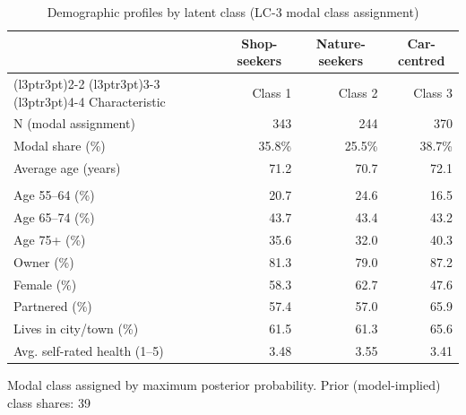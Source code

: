 \begin{table}[!h]
\centering
\caption{\label{tab:lc-profiles}Demographic profiles by latent class (LC-3 modal class assignment)}
\centering
\begin{threeparttable}
\begin{tabular}[t]{lrrr}
\toprule
\multicolumn{1}{c}{ } & \multicolumn{1}{c}{Shop-seekers} & \multicolumn{1}{c}{Nature-seekers} & \multicolumn{1}{c}{Car-centred} \\
\cmidrule(l{3pt}r{3pt}){2-2} \cmidrule(l{3pt}r{3pt}){3-3} \cmidrule(l{3pt}r{3pt}){4-4}
Characteristic & Class 1 & Class 2 & Class 3\\
\midrule
N (modal assignment) & 343 & 244 & 370\\
Modal share (\%) & 35.8\% & 25.5\% & 38.7\%\\
Average age (years) & 71.2 & 70.7 & 72.1\\
\addlinespace[0.3em]
\multicolumn{4}{l}{\textbf{Age group}}\\
\hspace{1em}Age 55--64 (\%) & 20.7 & 24.6 & 16.5\\
\hspace{1em}Age 65--74 (\%) & 43.7 & 43.4 & 43.2\\
\hspace{1em}Age 75+ (\%) & 35.6 & 32.0 & 40.3\\
Owner (\%) & 81.3 & 79.0 & 87.2\\
Female (\%) & 58.3 & 62.7 & 47.6\\
Partnered (\%) & 57.4 & 57.0 & 65.9\\
Lives in city/town (\%) & 61.5 & 61.3 & 65.6\\
Avg. self-rated health (1--5) & 3.48 & 3.55 & 3.41\\
\bottomrule
\end{tabular}
\begin{tablenotes}
\item Modal class assigned by maximum posterior probability. Prior (model-implied) class shares: 39%
\end{tablenotes}
\end{threeparttable}
\end{table}

